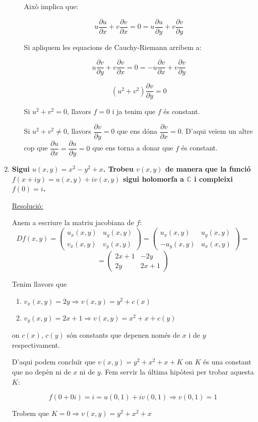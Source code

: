 \documentclass[10pt,a4paper]{article}
\begin{document}
\begin{enumerate}
\begin{enumerate}
Això implica que:

$$u \frac{\partial u}{\partial x} + v \frac{\partial v}{\partial x} = 0 = u \frac{\partial u}{\partial y} + v \frac{\partial v}{\partial y}$$

Si apliquem les equacions de Cauchy-Riemann arribem a:

$$u \frac{\partial v}{\partial y} + v \frac{\partial v}{\partial x} = 0 = -u \frac{\partial v}{\partial x} + v \frac{\partial v}{\partial y}$$

$$(u^{2} + v^{2}) \frac{\partial v}{\partial y} = 0$$

Si $u^{2}+v^{2}=0$, llavors $f=0$ i ja tenim que $f$ és constant. 

Si $u^{2}+v^{2}\neq 0$, llavors $\dfrac{\partial v}{\partial y}=0$ que ens dóna $\dfrac{\partial v}{\partial x}=0$. D'aqui veïem un altre cop que $\dfrac{\partial u}{\partial x}=\dfrac{\partial u}{\partial y}=0$ que ens torna a donar que $f$ és constant.

\end{enumerate}

\item \textbf{Sigui $u(x,y)=x^{2}-y^{2}+x$. Trobeu $v(x,y)$ de manera que la funció $f(x+iy)=u(x,y)+iv(x,y)$ sigui holomorfa a $\mathbb{C}$ i compleixi $f(0)=i$.}

\underline{Resolució:}

Anem a escriure la matriu jacobiana de $f$:
$$Df(x,y)=
\left(\begin{matrix}
  u_{x}(x,y) & u_{y}(x,y) \\
  v_{x}(x,y) & v_{y}(x,y)
\end{matrix}\right) = 
\left(\begin{matrix}
  u_{x}(x,y) & u_{y}(x,y) \\
  -u_{y}(x,y) & u_{x}(x,y)
\end{matrix}\right) = $$
$$= \left(\begin{matrix}
  2x+1 & -2y \\
  2y & 2x+1
\end{matrix}\right)$$

Tenim llavors que 
\begin{enumerate}
\item $v_{x}(x,y) = 2y \Rightarrow  v(x,y) = y^{2} + c(x)$
\item $v_{y}(x,y) = 2x+1 \Rightarrow v(x,y) = x^{2} + x + c(y)$
\end{enumerate}

on $c(x)$, $c(y)$ són constants que depenen només de $x$ i de $y$ respectivament.

D'aqui podem concluïr que $v(x,y) = y^{2} + x^{2} + x + K$ on $K$ és una constant que no depèn ni de $x$ ni de $y$. Fem servir la última hipòtesi per trobar aquesta $K$:

$$f(0+0i) = i = u(0,1) + iv(0,1) \Rightarrow v(0,1) = 1$$ 

Trobem que $K=0 \Rightarrow v(x,y) = y^{2} + x^{2} + x$

\end{enumerate}
\end{document}
